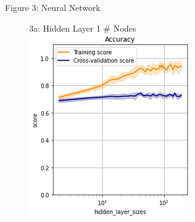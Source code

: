 \documentclass{article}
\begin{document}
\begin{figure}
	\centering
	Figure 3: Neural Network\\
	\begin{subfigure}{.3\textwidth}
		\centering
		3a: Hidden Layer 1 \# Nodes
		\includegraphics[width=\linewidth]{poland_nn_hidden_layer_size_2_200_accuracy.png}
		

\end{subfigure}
\end{figure}
\end{document}
